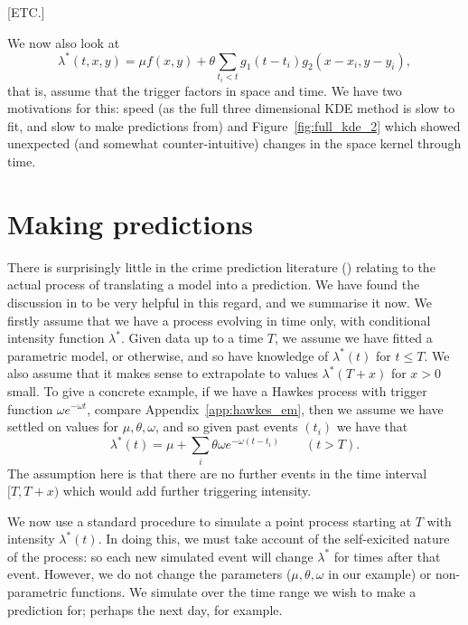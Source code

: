 \documentclass[twoside,a4paper]{article}
\theoremstyle{plain}
\theoremstyle{definition}
\begin{document}
[ETC.]


We now also look at
\[ \lambda^*(t,x,y) = \mu f(x,y) + \theta \sum_{t_i < t} g_1(t-t_i) g_2(x-x_i, y-y_i), \]
that is, assume that the trigger factors in space and time.  We have two motivations for this:
speed (as the full three dimensional KDE method is slow to fit, and slow to make predictions
from) and Figure~\ref{fig:full_kde_2} which showed unexpected (and somewhat counter-intuitive)
changes in the space kernel through time.










\section{Making predictions}\label{sec:making_preds}

There is surprisingly little in the crime prediction literature (\cite{sepp, sepp2, rc})
relating to the actual process of translating a model into a prediction.  We have found
the discussion in \cite[Section~1]{vj} to be very helpful in this regard, and we summarise
it now.  We firstly assume that we have a process evolving in time only, with conditional
intensity function $\lambda^*$.  Given data up to a time $T$, we assume we have fitted a
parametric model, or otherwise, and so have knowledge of $\lambda^*(t)$ for $t\leq T$.
We also assume that it makes sense to extrapolate to values $\lambda^*(T+x)$ for $x>0$ small.
To give a concrete example, if we have a Hawkes process with trigger function
$\omega e^{-\omega t}$, compare Appendix~\ref{app:hawkes_em}, then we assume we have settled
on values for $\mu, \theta, \omega$, and so given past events $(t_i)$ we have that
\[ \lambda^*(t) = \mu + \sum_i \theta \omega e^{-\omega (t-t_i)}
\qquad (t>T). \]
The assumption here is that there are no further events in the time interval $[T, T+x)$ which
would add further triggering intensity.

We now use a standard procedure to simulate a point process starting at $T$ with intensity
$\lambda^*(t)$.  In doing this, we must take account of the self-exicited nature of the
process: so each new simulated event will change $\lambda^*$ for times after that event.
However, we do not change the parameters ($\mu, \theta, \omega$ in our example) or non-parametric
functions.  We simulate over the time range we wish to make a prediction for; perhaps the
next day, for example.
\end{document}
